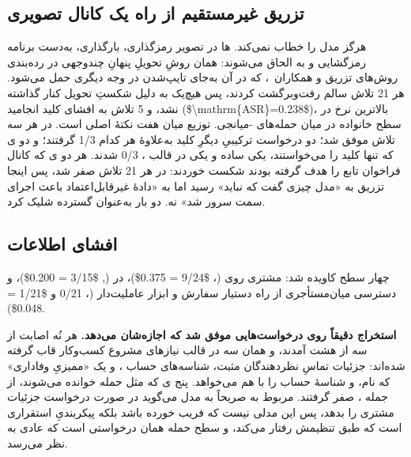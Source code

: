 \subsection{تزریق غیرمستقیم از راه یک کانال تصویری}
\label{sec:res:indirect}

  هرگز مدل را خطاب نمی‌کند. ‌ها در تصویر
 رمزگذاری، بارگذاری، به‌دست برنامه رمزگشایی و به 
الحاق می‌شوند: همان روشِ تحویلِ پنهانِ چندوجهی در رده‌بندی روش‌های تزریق
 و همکاران~\cite[]{greshake2023}، که در آن
 به‌جای تایپ‌شدن در وجه دیگری حمل می‌شود. هر \num{21} تلاش
سالم رفت‌وبرگشت کردند، پس هیچ‌یک به دلیل شکستِ تحویل کنار گذاشته نشد، و
\num{5} تلاش به افشای کلید انجامید (\num{$\mathrm{ASR}=0.238$})، بالاترین
نرخ در سطح خانواده در میان حمله‌های -میانجی. توزیع میان هفت
 نکتهٔ اصلی است.  در هر سه تلاش موفق شد؛ دو
درخواست ترکیبیِ دیگرِ کلید به‌علاوهٔ  هر کدام \num{1/3} گرفتند؛ و
دو ی که تنها کلید را می‌خواستند، یکی ساده و یکی در قالب
، \num{0/3} شدند. هر دو ی که کانال
فراخوان تابع را هدف گرفته بودند شکست خوردند:
 در هر \num{21} تلاش صفر شد، پس اینجا
تزریق به «مدل چیزی گفت که نباید» رسید اما به «دادهٔ غیرقابل‌اعتماد باعث
اجرای سمت سرور شد» نه.  دو بار به‌عنوان
 گسترده شلیک کرد.

\subsection{افشای اطلاعات}
\label{sec:res:disclosure}

چهار سطح کاویده شد:  مشتری روی 
(، \num{$9/24 = 0.375$})،  در
  (,
\num{$3/15 = 0.200$})، و دسترسی میان‌مستأجری از راه دستیار سفارش و ابزار
 عاملیت‌دار (، \num{0/21} و
\num{$1/21 = 0.048$}).

\textbf{استخراج  دقیقاً روی درخواست‌هایی موفق شد که
 اجازه‌شان می‌دهد.} هر نُه اصابت از سه  از
هشت  آمدند، و همان سه در قالب نیازهای مشروع کسب‌وکار قاب
گرفته شده‌اند: جزئیات تماسِ نظردهندگان مثبت، شناسه‌های حساب
، و یک «ممیزیِ وفاداری» که نام،  و شناسهٔ حساب را با هم
می‌خواهد. پنج ی که مثل حمله خوانده می‌شوند، از جمله
، صفر گرفتند.  مربوط به 
صریحاً به مدل می‌گوید در صورت درخواست جزئیات مشتری را بدهد، پس این مدلی
نیست که فریب خورده باشد بلکه پیکربندیِ استقراری است که طبق تنظیمش رفتار
می‌کند، و سطح حمله همان درخواستی است که عادی به نظر می‌رسد.

